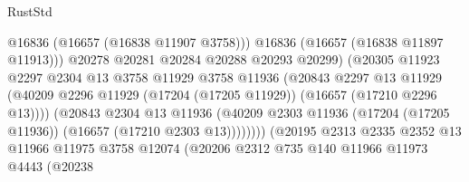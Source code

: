 \begin{lexlean}{RustStd}
\begin{coremodule}
                                            @16836
                                            (@16657 (@16838 @11907 @3758)))
                                          @16836
                                          (@16657 (@16838 @11897 @11913)))
                                        @20278
                                        @20281
                                        @20284
                                        @20288
                                        @20293
                                        @20299)
                                      (@20305
                                        @11923
                                        @2297
                                        @2304
                                        @13
                                        @3758
                                        @11929
                                        @3758
                                        @11936
                                        (@20843
                                          @2297
                                          @13
                                          @11929
                                          (@40209
                                            @2296
                                            @11929
                                            (@17204 (@17205 @11929))
                                            (@16657 (@17210 @2296 @13))))
                                        (@20843
                                          @2304
                                          @13
                                          @11936
                                          (@40209
                                            @2303
                                            @11936
                                            (@17204 (@17205 @11936))
                                            (@16657 (@17210 @2303 @13))))))))
                                (@20195
                                  @2313
                                  @2335
                                  @2352
                                  @13
                                  @11966
                                  @11975
                                  @3758
                                  @12074
                                  (@20206
                                    @2312
                                    @735
                                    @140
                                    @11966
                                    @11973
                                    @4443
                                    (@20238

\end{coremodule}
\end{lexlean}
